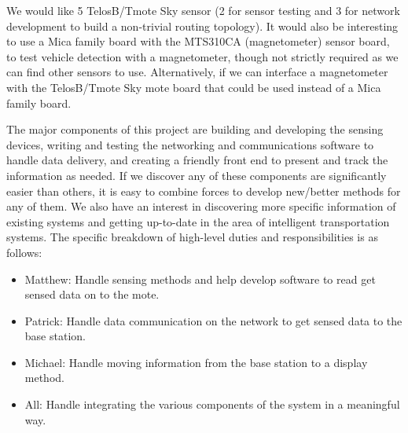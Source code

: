 \documentclass[12pt]{article}
\begin{document}
We would like 5 TelosB/Tmote Sky sensor (2 for sensor testing and 3 for network
development to build a non-trivial routing topology).
It would also be interesting to use a Mica family board with the MTS310CA
(magnetometer) sensor board, to test vehicle detection with a magnetometer,
though not strictly required as we can find other sensors to use.
Alternatively, if we can interface a magnetometer with the TelosB/Tmote Sky
mote board that could be used instead of a Mica family board.

The major components of this project are building and developing the sensing
devices, writing and testing the networking and communications
software to handle data delivery, and creating a friendly front end to present
and track the information as needed.
If we discover any of these components are significantly easier than others, it
is easy to combine forces to develop new/better methods for any of them.
We also have an interest in discovering more specific information of existing
systems and getting up-to-date in the area of intelligent transportation
systems.  The specific breakdown of high-level duties and responsibilities is as
follows:

\begin{itemize}
    \item Matthew: Handle sensing methods and help develop software to read get
    sensed data on to the mote.
    \item Patrick: Handle data communication on the network to get sensed data
    to the base station.
    \item Michael: Handle moving information from the base station to a display
    method.
    \item All: Handle integrating the various components of the system in a
    meaningful way.
\end{itemize}
\end{document}
